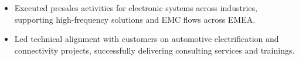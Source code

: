 \documentclass[9pt,a4paper,ragged2e,withhyper]{altacv} %
\begin{document}
\begin{paracol}{2}
\begin{itemize}
\item Executed presales activities for electronic systems across industries, supporting
high-frequency solutions and EMC flows across EMEA.
\item Led technical alignment with customers on automotive electrification and
connectivity projects, successfully delivering consulting services and trainings.
\end{itemize}
\divider


\end{paracol}
\end{document}
